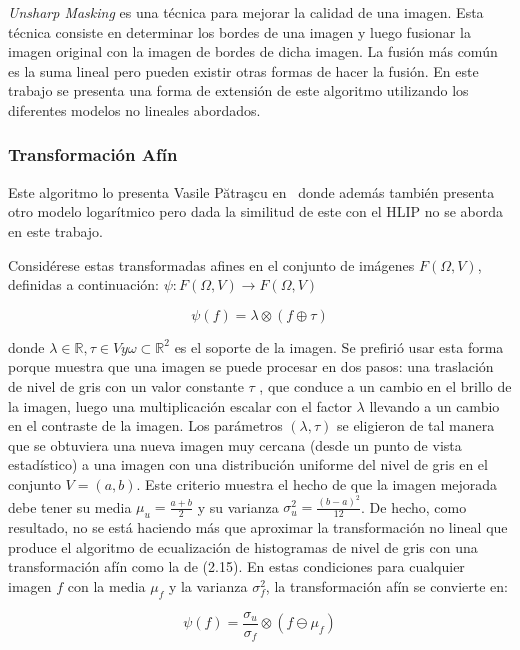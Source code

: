 \textit{Unsharp Masking} es una t\'ecnica para mejorar la calidad de una imagen. Esta t\'ecnica consiste en determinar los bordes de una imagen y luego fusionar la imagen original con la imagen de bordes de dicha imagen. La fusi\'on m\'as com\'un es la suma lineal pero pueden existir otras formas de hacer la fusi\'on. En este trabajo se presenta una forma de extensi\'on de este algoritmo utilizando los diferentes modelos no lineales abordados.

\subsubsection{Transformaci\'on Af\'in}

Este algoritmo lo presenta Vasile Pătraşcu en~\cite{patrascu2003gray} donde adem\'as tambi\'en presenta otro modelo logar\'itmico pero dada la similitud de este con el HLIP no se aborda en este trabajo.

Consid\'erese estas transformadas afines en el conjunto de imágenes $F (\Omega, V)$, definidas a continuaci\'on: $\psi : F (\Omega, V ) \to F (\Omega, V )$

\begin{equation}
	\psi(f)=\lambda\otimes(f\oplus\tau)
\end{equation}

donde $\lambda \in \mathbb{R}, \tau \in V y \omega\subset\mathbb{R}^2$ es el soporte de la imagen. Se prefirió usar esta forma porque muestra que una imagen se puede procesar en dos pasos: una traslación de nivel de gris con un valor constante $\tau$ , que conduce a un cambio en el brillo de la imagen, luego una multiplicación escalar con el factor $\lambda$  llevando a un cambio en el contraste de la imagen. Los parámetros $(\lambda, \tau )$ se eligieron de tal manera que se obtuviera una nueva imagen muy cercana (desde un punto de vista estadístico) a una imagen con una distribución uniforme del nivel de gris en el conjunto $V=(a,b)$. Este criterio muestra el hecho de que la imagen mejorada debe tener su media $\mu_u = \frac{a+b}{2}$ y su varianza $\sigma_u^2 = \frac{(b-a)^2}{12}$. De hecho, como resultado, no se est\'a haciendo más que aproximar la transformaci\'on no lineal que produce el algoritmo de ecualización de histogramas de nivel de gris con una transformaci\'on afín como la de (2.15). En estas condiciones para cualquier imagen $f$ con la media $\mu_f$ y la varianza $\sigma_f^2 $, la transformaci\'on afín  se convierte en:

\begin{equation}
	\psi(f)=\frac{\sigma_u}{\sigma_f}\otimes(f\ominus\mu_f)
\end{equation}

